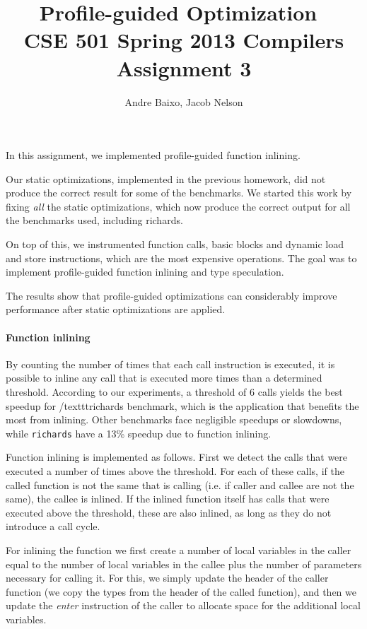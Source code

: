 \documentclass[10pt,twocolumn]{article}
\begin{document}
\title{Profile-guided Optimization\ \\
  \small CSE 501 Spring 2013 Compilers Assignment 3}
\author{Andre Baixo, Jacob Nelson}
\maketitle

In this assignment, we implemented profile-guided function inlining.

Our static optimizations, implemented in the previous homework, did not
produce the correct result for some of the benchmarks. We started this
work by fixing \emph{all} the static optimizations, which now produce
the correct output for all the benchmarks used, including richards.

On top of this, we instrumented function calls, basic blocks and
dynamic load and store instructions, which are the most expensive
operations. The goal was to implement profile-guided function inlining and type speculation.

The results show that profile-guided optimizations can considerably improve performance
after static optimizations are applied.

\paragraph{Function inlining}
By counting the number of times that each call instruction is executed, it is possible to inline any call that is executed more times than a determined threshold. According to our experiments, a threshold of 6 calls yields the best speedup for /texttt{richards} benchmark, which is the application that benefits the most from inlining. Other benchmarks face negligible speedups or slowdowns, while \texttt{richards} have a 13\% speedup due to function inlining.

Function inlining is implemented as follows. First we detect the calls that were executed a number of times above the threshold. For each of these calls, if the called function is not the same that is calling (i.e. if caller and callee are not the same), the callee is inlined. If the inlined function itself has calls that were executed above the threshold, these are also inlined, as long as they do not introduce a call cycle.

For inlining the function we first create a number of local variables in the caller equal to the number of local variables in the callee plus the number of parameters necessary for calling it. For this, we simply update the header of the caller function (we copy the types from the header of the called function), and then we update the \emph{enter} instruction of the caller to allocate space for the additional local variables.
\end{document}
